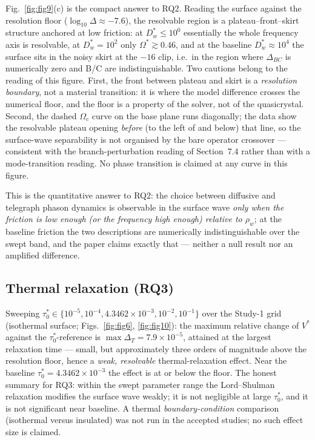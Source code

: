 \documentclass[11pt]{article}
\newcommand{\Om}{\Omega}
\newcommand{\rw}{\rho_w}
\begin{document}
Fig.~\ref{fig:fig9}(c) is the compact answer to RQ2. Reading the surface against the resolution floor ($\log_{10}\Delta\approx-7.6$), the resolvable region is a plateau--front--skirt structure anchored at low friction: at $D_w^*\le10^{0}$ essentially the whole frequency axis is resolvable, at $D_w^*=10^{2}$ only $\Om^*\gtrsim0.46$, and at the baseline $D_w^*\approx10^{4}$ the surface sits in the noisy skirt at the $-16$ clip, i.e.\ in the region where $\Delta_{BC}$ is numerically zero and B/C are indistinguishable. Two cautions belong to the reading of this figure. First, the front between plateau and skirt is a \emph{resolution boundary}, not a material transition: it is where the model difference crosses the numerical floor, and the floor is a property of the solver, not of the quasicrystal. Second, the dashed $\Om_c$ curve on the base plane runs diagonally; the data show the resolvable plateau opening \emph{before} (to the left of and below) that line, so the surface-wave separability is not organised by the bare operator crossover --- consistent with the branch-perturbation reading of Section~7.4 rather than with a mode-transition reading. No phase transition is claimed at any curve in this figure.

This is the quantitative answer to RQ2: the choice between diffusive and telegraph phason dynamics is observable in the surface wave \emph{only when the friction is low enough (or the frequency high enough) relative to $\rw$}; at the baseline friction the two descriptions are numerically indistinguishable over the swept band, and the paper claims exactly that --- neither a null result nor an amplified difference.

\subsection{Thermal relaxation (RQ3)}

Sweeping $\tau_0^*\in\{10^{-5},10^{-4},4.3462\times10^{-3},10^{-2},10^{-1}\}$ over the Study-1 grid (isothermal surface; Figs.~\ref{fig:fig6}, \ref{fig:fig10}): the maximum relative change of $V^*$ against the $\tau_0^*$-reference is $\max\Delta_T=7.9\times10^{-5}$, attained at the largest relaxation time --- small, but approximately three orders of magnitude above the resolution floor, hence a \emph{weak, resolvable} thermal-relaxation effect. Near the baseline $\tau_0^*=4.3462\times10^{-3}$ the effect is at or below the floor. The honest summary for RQ3: within the swept parameter range the Lord--Shulman relaxation modifies the surface wave weakly; it is not negligible at large $\tau_0^*$, and it is not significant near baseline. A thermal \emph{boundary-condition} comparison (isothermal versus insulated) was not run in the accepted studies; no such effect size is claimed.
\end{document}
